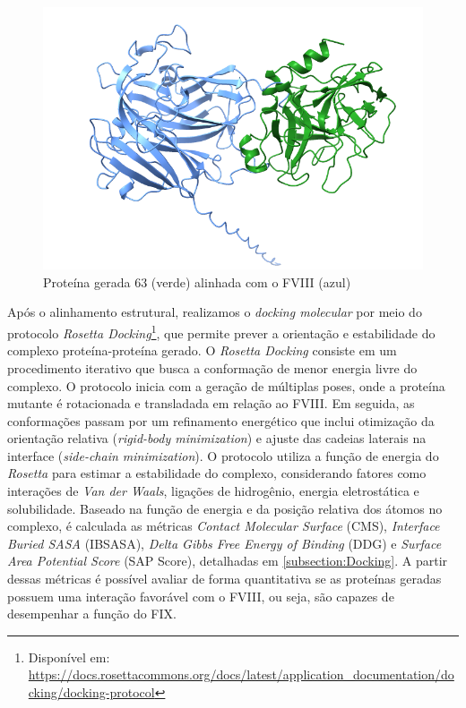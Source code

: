 \begin{figure}[H]
  \centering
  \includegraphics[width=.6\textwidth]{figuras/complexocomid63.png}
  \caption{Proteína gerada 63 (verde) alinhada com o FVIII (azul)}
\end{figure}

Após o alinhamento estrutural, realizamos o \textit{docking molecular} 
por meio do protocolo \textit{Rosetta Docking}\footnote{Disponível em: \url{https://docs.rosettacommons.org/docs/latest/application_documentation/docking/docking-protocol}}, 
que permite prever a orientação e estabilidade do complexo proteína-proteína gerado.
O \textit{Rosetta Docking} consiste em um procedimento iterativo que busca a conformação de menor energia livre do complexo.
O protocolo inicia com a geração de múltiplas poses, onde a proteína mutante é rotacionada e transladada em relação ao FVIII.
Em seguida, as conformações passam por um refinamento energético que inclui otimização da 
orientação relativa (\textit{rigid-body minimization}) e ajuste das cadeias laterais na interface 
(\textit{side-chain minimization}). 
O protocolo utiliza a função de energia do \textit{Rosetta} para estimar a estabilidade do complexo,
considerando fatores como interações de \textit{Van der Waals}, 
ligações de hidrogênio, energia eletrostática e solubilidade.
Baseado na função de energia e da posição relativa dos átomos no complexo, 
é calculada as métricas 
\textit{Contact Molecular Surface} (CMS), 
\textit{Interface Buried SASA} (IBSASA), 
\textit{Delta Gibbs Free Energy of Binding} (DDG) e
\textit{Surface Area Potential Score} (SAP Score), detalhadas em \ref{subsection:Docking}.
A partir dessas métricas é possível avaliar de forma quantitativa 
se as proteínas geradas possuem uma interação favorável com o FVIII, ou seja, 
são capazes de desempenhar a função do FIX.

